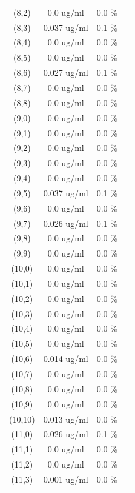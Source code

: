 \documentclass{article}
\begin{document}
\begin{tabular}{c c c c}
(8,2)&        0.0 ug/ml        &0.0 \%\\
(8,3)&        0.037 ug/ml        &0.1 \%\\
(8,4)&        0.0 ug/ml        &0.0 \%\\
(8,5)&        0.0 ug/ml        &0.0 \%\\
(8,6)&        0.027 ug/ml        &0.1 \%\\
(8,7)&        0.0 ug/ml        &0.0 \%\\
(8,8)&        0.0 ug/ml        &0.0 \%\\
(9,0)&        0.0 ug/ml        &0.0 \%\\
(9,1)&        0.0 ug/ml        &0.0 \%\\
(9,2)&        0.0 ug/ml        &0.0 \%\\
(9,3)&        0.0 ug/ml        &0.0 \%\\
(9,4)&        0.0 ug/ml        &0.0 \%\\
(9,5)&        0.037 ug/ml        &0.1 \%\\
(9,6)&        0.0 ug/ml        &0.0 \%\\
(9,7)&        0.026 ug/ml        &0.1 \%\\
(9,8)&        0.0 ug/ml        &0.0 \%\\
(9,9)&        0.0 ug/ml        &0.0 \%\\
(10,0)&        0.0 ug/ml        &0.0 \%\\
(10,1)&        0.0 ug/ml        &0.0 \%\\
(10,2)&        0.0 ug/ml        &0.0 \%\\
(10,3)&        0.0 ug/ml        &0.0 \%\\
(10,4)&        0.0 ug/ml        &0.0 \%\\
(10,5)&        0.0 ug/ml        &0.0 \%\\
(10,6)&        0.014 ug/ml        &0.0 \%\\
(10,7)&        0.0 ug/ml        &0.0 \%\\
(10,8)&        0.0 ug/ml        &0.0 \%\\
(10,9)&        0.0 ug/ml        &0.0 \%\\
(10,10)&        0.013 ug/ml        &0.0 \%\\
(11,0)&        0.026 ug/ml        &0.1 \%\\
(11,1)&        0.0 ug/ml        &0.0 \%\\
(11,2)&        0.0 ug/ml        &0.0 \%\\
(11,3)&        0.001 ug/ml        &0.0 \%\\

\end{tabular}
\end{document}
